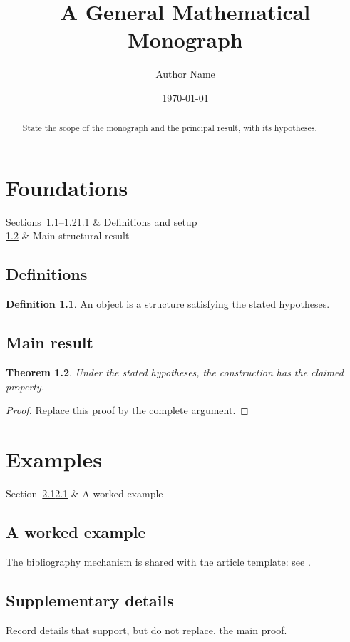 \documentclass[11pt]{amsart}
\title{A General Mathematical Monograph}
\author{Author Name}
\date{\today}
\newtheorem{theorem}{Theorem}[section]
\theoremstyle{definition}
\newtheorem{definition}[theorem]{Definition}
\theoremstyle{remark}
\begin{document}
\begin{abstract}
State the scope of the monograph and the principal result, with its hypotheses.
\end{abstract}
\bookfrontmatter
\tableofcontents
\bookmainmatter

\chapter{Foundations}{Sections~\ref*{sec:definitions}--\ref*{sec:main}}{\ref*{sec:definitions} & Definitions and setup\\\ref*{sec:main} & Main structural result}
\section{Definitions}\label{sec:definitions}
\begin{definition}An object is a structure satisfying the stated hypotheses.\end{definition}
\section{Main result}\label{sec:main}
\begin{theorem}Under the stated hypotheses, the construction has the claimed property.\end{theorem}
\begin{proof}Replace this proof by the complete argument.\end{proof}

\chapter{Examples}{Section~\ref*{sec:example}}{\ref*{sec:example} & A worked example}
\section{A worked example}\label{sec:example}
The bibliography mechanism is shared with the article template: see \cite{lamport}.

\bookbackmatter
\appendix
\section{Supplementary details}
Record details that support, but do not replace, the main proof.
\clearpage
{}
\thispagestyle{plain}


\end{document}
